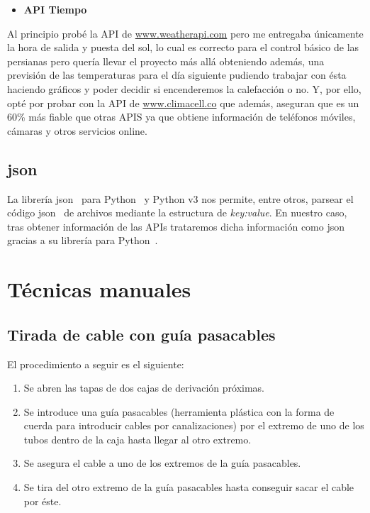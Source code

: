 \begin{itemize}
    \item \textbf{API Tiempo}\label{4:API_Tiempo}
\end{itemize}
Al principio probé la API de \url{www.weatherapi.com} pero me entregaba únicamente la hora de salida y puesta del sol, lo cual es correcto para el control básico de las persianas pero quería llevar el proyecto más allá obteniendo además, una previsión de las temperaturas para el día siguiente pudiendo trabajar con ésta haciendo gráficos y poder decidir si encenderemos la calefacción o no. Y, por ello, opté por probar con la API de \url{www.climacell.co} que además, aseguran que es un 60\% más fiable que otras APIS ya que obtiene información de teléfonos móviles, cámaras y otros servicios online.

\subsection{json}\label{4:JSON}
La librería json~\cite{misc:Json} para Python~\cite{misc:Python} y Python v3 nos permite, entre otros, parsear el código json~\cite{misc:Json} de archivos mediante la estructura de \textit{key:value}. En nuestro caso, tras obtener información de las APIs trataremos dicha información como json~\cite{misc:Json} gracias a su librería para Python~\cite{misc:Python}.

\section{Técnicas manuales}

\subsection{Tirada de cable con guía pasacables}\label{4:guiaPasacables}
El procedimiento a seguir es el siguiente:
\begin{enumerate}
        \item Se abren las tapas de dos cajas de derivación próximas.
        \item Se introduce una guía pasacables (herramienta plástica con la forma de cuerda para introducir cables por canalizaciones) por el extremo de uno de los tubos dentro de la caja hasta llegar al otro extremo.
        \item Se asegura el cable a uno de los extremos de la guía pasacables.
        \item Se tira del otro extremo de la guía pasacables hasta conseguir sacar el cable por éste.
\end{enumerate}

